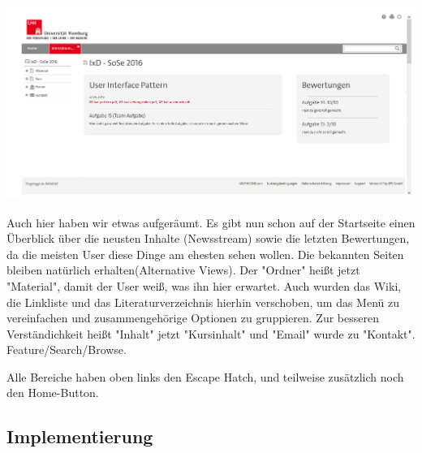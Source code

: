 \documentclass[a4paper,10pt]{article}
\begin{document}
\includegraphics[scale=0.4]{images/ixd_seite.png}

Auch hier haben wir etwas aufgeräumt. Es gibt nun schon auf der Startseite einen Überblick über die neusten Inhalte (Newsstream) sowie die letzten Bewertungen, da die meisten User diese Dinge am ehesten sehen wollen. Die bekannten Seiten bleiben natürlich erhalten(Alternative Views). Der "Ordner" heißt jetzt "Material", damit der User weiß, was ihn hier erwartet. Auch wurden das Wiki, die Linkliste und das Literaturverzeichnis hierhin verschoben, um das Menü zu vereinfachen und zusammengehörige Optionen zu gruppieren. Zur besseren Verständichkeit heißt "Inhalt" jetzt "Kursinhalt" und "Email" wurde zu "Kontakt". Feature/Search/Browse.

Alle Bereiche haben oben links den Escape Hatch, und teilweise zusätzlich noch den Home-Button. 

\subsection{Implementierung} 
\end{document}
